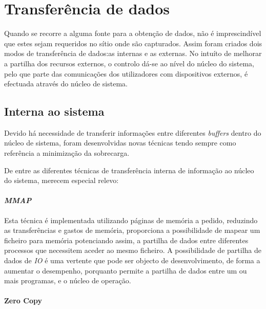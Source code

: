 \section{Transferência de dados}
\label{sect:kernel_user_comm}

Quando se recorre a alguma fonte para a obtenção de dados, não é imprescindível que estes sejam requeridos no sítio onde são capturados.
Assim foram criados dois modos de transferência de dados:as internas e as externas.
No intuíto de melhorar a partilha dos recursos externos, o controlo dá-se ao nível do núcleo do sistema, pelo que parte das comunicações dos utilizadores com dispositivos externos, é efectuada através do núcleo de sistema.

\subsection{Interna ao sistema}

Devido há necessidade de transferir informações entre diferentes \textit{buffers} dentro do núcleo de sistema, foram desenvolvidas novas técnicas tendo sempre como referência a minimização da sobrecarga.

De entre as diferentes técnicas de transferência interna de informação ao núcleo do sistema, merecem especial relevo:

\paragraph*{\textit{MMAP}}
\label{par:MMAP_overview}


Esta técnica é implementada utilizando páginas de memória a pedido, reduzindo as transferências e gastos de memória, proporciona a possibilidade de mapear um ficheiro para memória potenciando assim, a partilha de dados entre diferentes processos que necessitem aceder ao mesmo ficheiro.
A possibilidade de partilha de dados de \textit{IO} é uma vertente que pode ser objecto de desenvolvimento, de forma a aumentar o desempenho, porquanto permite a partilha de dados entre um ou mais programas, e o núcleo de operação.

\paragraph*{Zero Copy}
\label{par:zero_copy_overview}

